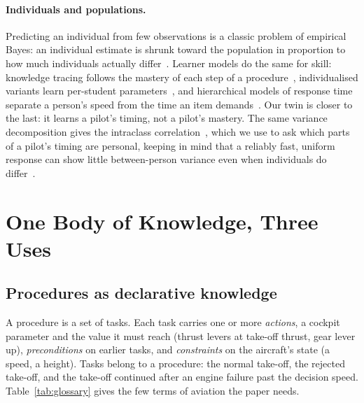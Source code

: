 \documentclass{llncs}
\begin{document}
\paragraph{Individuals and populations.} Predicting an individual from few observations is a classic problem of empirical Bayes: an
individual estimate is shrunk toward the population in proportion to how much individuals actually differ~\cite{efron_morris_1975}.
Learner models do the same for skill: knowledge tracing follows the mastery of each step of a procedure~\cite{corbett_knowledge_tracing_1995},
individualised variants learn per-student parameters~\cite{yudelson_individualized_2013}, and hierarchical models of response time
separate a person's speed from the time an item demands~\cite{van_der_linden_hierarchical_2007}. Our twin is closer to the last: it
learns a pilot's timing, not a pilot's mastery. The same variance decomposition gives the intraclass correlation~\cite{shrout_fleiss_1979},
which we use to ask which parts of a pilot's timing are personal, keeping in mind that a reliably fast, uniform response can show little
between-person variance even when individuals do differ~\cite{hedge_reliability_2018}.

\section{One Body of Knowledge, Three Uses}
\label{sec:system}

\subsection{Procedures as declarative knowledge}

A procedure is a set of tasks. Each task carries one or more \emph{actions}, a cockpit parameter and the value it must reach (thrust
levers at take-off thrust, gear lever up), \emph{preconditions} on earlier tasks, and \emph{constraints} on the aircraft's state (a
speed, a height). Tasks belong to a procedure: the normal take-off, the rejected take-off, and the take-off continued after an engine
failure past the decision speed. Table~\ref{tab:glossary} gives the few terms of aviation the paper needs.
\end{document}
